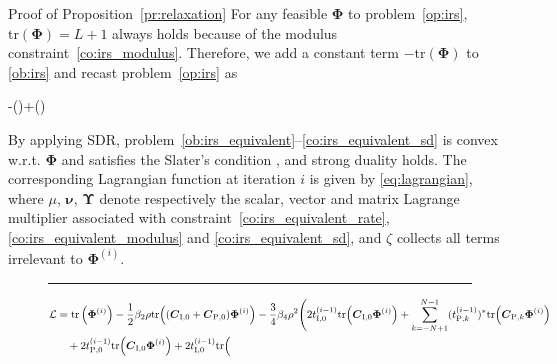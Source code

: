 \documentclass[journal]{IEEEtran}
\begin{document}
	\begin{appendix}
		\begin{subsection}{Proof of Proposition~\ref{pr:relaxation}}\label{ap:relaxation}
			For any feasible $\boldsymbol{\Phi}$ to problem~\eqref{op:irs}, $\mathrm{tr}(\boldsymbol{\Phi})=L+1$ always holds because of the modulus constraint~\eqref{co:irs_modulus}. Therefore, we add a constant term $-\mathrm{tr}(\boldsymbol{\Phi})$ to \eqref{ob:irs} and recast problem~\eqref{op:irs} as
			\begin{maxi!}
				{\scriptstyle{\boldsymbol{\Phi}}}{-(\boldsymbol{\Phi})+(\boldsymbol{\Phi})}{\label{op:irs_equivalent}}{\label{ob:irs_equivalent}}
				\label{co:irs_equivalent_rate}
				\label{co:irs_equivalent_modulus}
				\label{co:irs_equivalent_sd}
			\end{maxi!}
			By applying SDR, problem~\eqref{ob:irs_equivalent}--\eqref{co:irs_equivalent_sd} is convex w.r.t. $\boldsymbol{\Phi}$ and satisfies the Slater's condition \cite{Boyd2004}, and strong duality holds. The corresponding Lagrangian function at iteration $i$ is given by \eqref{eq:lagrangian}, where $\mu$, $\boldsymbol{\nu}$, $\boldsymbol{\Upsilon}$ denote respectively the scalar, vector and matrix Lagrange multiplier associated with constraint~\eqref{co:irs_equivalent_rate}, \eqref{co:irs_equivalent_modulus} and \eqref{co:irs_equivalent_sd}, and $\zeta$ collects all terms irrelevant to $\boldsymbol{\Phi}^{(i)}$.
			\begin{figure}[!b]
				\hrule
				\begin{align}\label{eq:lagrangian}
					\mathcal{L}
					& = \mathrm{tr}\left(\boldsymbol{\Phi}^{(i)}\right) - \frac{1}{2} \beta_2 \rho \mathrm{tr}\Bigl(
							(\boldsymbol{C}_{\mathrm{I},0} + \boldsymbol{C}_{\mathrm{P},0}) \boldsymbol{\Phi}^{(i)}
						\Bigr) - \frac{3}{4} \beta_4 \rho^2 \Biggl(
							2 t_{\mathrm{I},0}^{(i-1)} \mathrm{tr}\Bigl(
								\boldsymbol{C}_{\mathrm{I},0} \boldsymbol{\Phi}^{(i)}
							\Bigr) + \sum_{k=-N+1}^{N-1} (t_{\mathrm{P},k}^{(i-1)})^* \mathrm{tr}\Bigl(
								\boldsymbol{C}_{\mathrm{P},k} \boldsymbol{\Phi}^{(i)}
							\Bigr)\nonumber\\
					& \quad + 2 t_{\mathrm{P},0}^{(i-1)} \mathrm{tr}\Bigl(
							\boldsymbol{C}_{\mathrm{I},0} \boldsymbol{\Phi}^{(i)}
						\Bigr) + 2 t_{\mathrm{I},0}^{(i-1)} \mathrm{tr}\Bigl(

\end{align}
\end{figure}
\end{subsection}
\end{appendix}
\end{document}
